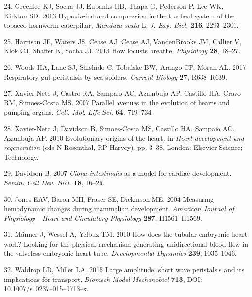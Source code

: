 \documentclass[
]{article}
\begin{document}
\leavevmode\hypertarget{ref-Greenlee:2013}{}%
24. Greenlee KJ, Socha JJ, Eubanks HB, Thapa G, Pederson P, Lee WK,
Kirkton SD. 2013 Hypoxia-induced compression in the tracheal system of
the tobacco hornworm caterpillar, \emph{Manduca sexta} L. \emph{J. Exp.
Biol.} \textbf{216}, 2293--2301.

\leavevmode\hypertarget{ref-Harrison:2013}{}%
25. Harrison JF, Waters JS, Cease AJ, Cease AJ, VandenBrooks JM, Callier
V, Klok CJ, Shaffer K, Socha JJ. 2013 How locusts breathe.
\emph{Physiology} \textbf{28}, 18--27.

\leavevmode\hypertarget{ref-Woods:2017}{}%
26. Woods HA, Lane SJ, Shishido C, Tobalske BW, Arango CP, Moran AL.
2017 Respiratory gut peristalsis by sea spiders. \emph{Current Biology}
\textbf{27}, R638--R639.

\leavevmode\hypertarget{ref-Xavier-Neto:2007}{}%
27. Xavier-Neto J, Castro RA, Sampaio AC, Azambuja AP, Castillo HA,
Cravo RM, Simoes-Costa MS. 2007 Parallel avenues in the evolution of
hearts and pumping organs. \emph{Cell. Mol. Life Sci.} \textbf{64},
719--734.

\leavevmode\hypertarget{ref-Xavier-Neto:2010}{}%
28. Xavier-Neto J, Davidson B, Simoes-Costa MS, Castillo HA, Sampaio AC,
Azambuja AP. 2010 Evolutionary origins of the heart. In \emph{Heart
development and regeneration} (eds N Rosenthal, RP Harvey), pp. 3--38.
London: Elsevier Science; Technology.

\leavevmode\hypertarget{ref-Davidson:2007}{}%
29. Davidson B. 2007 \emph{Ciona intestinalis} as a model for cardiac
development. \emph{Semin. Cell Dev. Biol.} \textbf{18}, 16--26.

\leavevmode\hypertarget{ref-Jones:2004}{}%
30. Jones EAV, Baron MH, Fraser SE, Dickinson ME. 2004 Measuring
hemodynamic changes during mammalian development. \emph{American Journal
of Physiology - Heart and Circulatory Physiology} \textbf{287},
H1561--H1569.

\leavevmode\hypertarget{ref-Manner:2010}{}%
31. Männer J, Wessel A, Yelbuz TM. 2010 How does the tubular embryonic
heart work? Looking for the physical mechanism generating unidirectional
blood flow in the valveless embryonic heart tube. \emph{Developmental
Dynamics} \textbf{239}, 1035--1046.

\leavevmode\hypertarget{ref-Waldrop:peristalsis}{}%
32. Waldrop LD, Miller LA. 2015 Large amplitude, short wave peristalsis
and its implications for transport. \emph{Biomech Model Mechanobiol}
\textbf{713}, DOI: 10.1007/s10237--015--0713--x.
\end{document}
